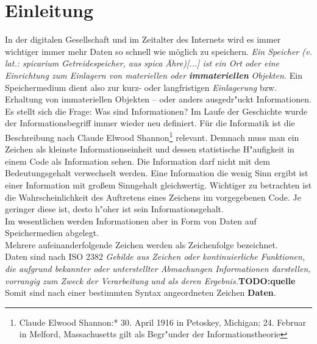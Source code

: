 
\chapter{Einleitung}
\label{ch:Einleitung}

In der digitalen Gesellschaft und im Zeitalter des Internets wird es immer wichtiger immer mehr Daten so schnell wie möglich zu speichern.  \textit{Ein Speicher (v. lat.: spicarium Getreidespeicher, aus spica Ähre)[...] ist ein Ort oder eine Einrichtung zum Einlagern von materiellen oder} \textbf{\textit{immateriellen}} \textit{Objekten.}\cite{wiki:Speicher}
\newline
Ein Speichermedium dient also zur kurz- oder langfristigen \glqq \textit{Einlagerung}\grqq{} bzw. \mbox{Erhaltung} von immateriellen Objekten – oder anders ausgedr"uckt Informationen. 
Es stellt sich die Frage: Was sind Informationen? \newline
Im Laufe der Geschichte wurde der Informationsbegriff immer wieder neu definiert. Für die Informatik ist die Beschreibung nach Claude Elwood Shannon\footnote{Claude Elwood Shannon:* 30. April 1916 in Petoskey, Michigan; \textdagger{} 24. Februar in Melford, Massachusetts gilt als Begr"under der Informationstheorie} relevant. Demnach muss man ein Zeichen als kleinste Informationseinheit und dessen \mbox{statistische} H"aufigkeit in einem Code als Information sehen. 
\newline
Die Information darf nicht mit dem Bedeutungsgehalt verwechselt werden. Eine Information die wenig Sinn ergibt ist einer Information mit großem Sinngehalt gleichwertig. Wichtiger zu betrachten ist die Wahrscheinlichkeit des Auftretens eines Zeichens im vorgegebenen Code. Je geringer diese ist, desto h"oher ist sein \mbox{Informationsgehalt}.
\\
Im wesentlichen werden Informationen aber in Form von Daten auf Speichermedien abgelegt. 
\\Mehrere aufeinanderfolgende Zeichen werden als Zeichenfolge bezeichnet.\cite{hansen:wi1}
\\ 
Daten sind nach ISO 2382 
\glqq \textit{Gebilde aus Zeichen oder kontinuierliche Funktionen, die aufgrund bekannter oder unterstellter Abmachungen Informationen darstellen, vorrangig zum Zweck der Verarbeitung und als deren Ergebnis.}\grqq{}\textbf{TODO:quelle} 
\\
Somit sind nach einer bestimmten Syntax angeordneten Zeichen \textbf{Daten}.

